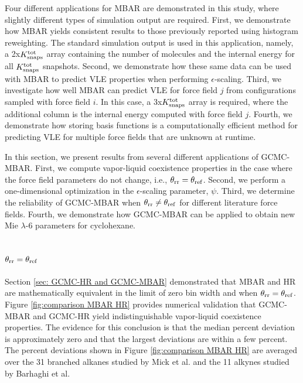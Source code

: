 \documentclass[journal=jced,manuscript=article]{achemso}
\begin{document}
Four different applications for MBAR are demonstrated in this study, where slightly different types of simulation output are required. First, we demonstrate how MBAR yields consistent results to those previously reported using histogram reweighting. The standard simulation output is used in this application, namely, a 2x$K^{\rm tot}_{\rm snaps}$ array containing the number of molecules and the internal energy for all $K^{\rm tot}_{\rm snaps}$ snapshots. Second, we demonstrate how these same data can be used with MBAR to predict VLE properties when performing $\epsilon$-scaling. Third, we investigate how well MBAR can predict VLE for force field $j$ from configurations sampled with force field $i$. In this case, a 3x$K^{\rm tot}_{\rm snaps}$ array is required, where the additional column is the internal energy computed with force field $j$. Fourth, we demonstrate how storing basis functions is a computationally efficient method for predicting VLE for multiple force fields that are unknown at runtime.   

In this section, we present results from several different applications of GCMC-MBAR. First, we compute vapor-liquid coexistence properties in the case where the force field parameters do not change, i.e., $\theta_{\rm rr} = \theta_{\rm ref}$. Second, we perform a one-dimensional optimization in the $\epsilon$-scaling parameter, $\psi$.  Third, we determine the reliability of GCMC-MBAR when $\theta_{\rm rr} \neq \theta_{\rm ref}$ for different literature force fields. Fourth, we demonstrate how GCMC-MBAR can be applied to obtain new Mie $\lambda$-6 parameters for cyclohexane.

\subsection{$\theta_{\rm rr} = \theta_{\rm ref}$}

Section \ref{sec: GCMC-HR and GCMC-MBAR} demonstrated that MBAR and HR are mathematically equivalent in the limit of zero bin width and when $\theta_{\rm rr} = \theta_{\rm ref}$. Figure \ref{fig:comparison MBAR HR} provides numerical validation that GCMC-MBAR and GCMC-HR yield indistinguishable vapor-liquid coexistence properties. The evidence for this conclusion is that the median percent deviation is approximately zero and that the largest deviations are within a few percent. The percent deviations shown in Figure \ref{fig:comparison MBAR HR} are averaged over the 31 branched alkanes studied by Mick et al. and the 11 alkynes studied by Barhaghi et al. 
\end{document}
